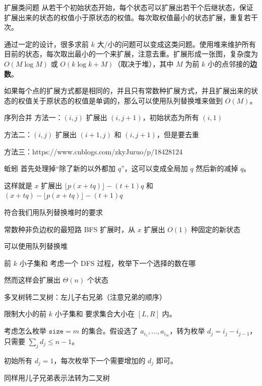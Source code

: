 \documentclass[11pt,aspectratio=169]{beamer}
\begin{document}
\begin{frame}{扩展类问题}
    从若干个初始状态开始，每个状态可以扩展出若干个后继状态，保证扩展出来的状态的权值小于原状态的权值。每次取权值最小的状态扩展，重复若干次。

    通过一定的设计，很多求前 $k$ 大/小的问题可以变成这类问题。使用堆来维护所有目前的状态，每次取出最小的一个来扩展，注意去重。扩展形成一张图，复杂度为 $O(M\log M)$ 或 $O(k\log k+M)$（取决于堆），其中 $M$ 为前 $k$ 小的点邻接的\textbf{边数}。

    如果每个点的扩展方式都是相同的，并且只有常数种扩展方式，并且扩展出来的状态的权值关于原状态的权值是单调的，那么可以使用队列替换堆来做到 $O(M)$。
\end{frame}
\begin{frame}{序列合并}
    方法一：$(i,j)$ 扩展出 $(i,j+1)$，初始状态为所有 $(i,1)$

    方法二：$(i,j)$ 扩展出 $(i+1,j)$ 和 $(i,j+1)$，但是要去重

    方法三：https://www.cnblogs.com/zkyJuruo/p/18428124
\end{frame}
\begin{frame}{蚯蚓}
    首先处理掉“除了新的以外都加 $q$”，这可以变成全局加 $q$ 然后新的减掉 $q$。

    这样就是 $x$ 扩展出 $\lfloor p(x+tq)\rfloor-(t+1)q$ 和 $(x+tq)-\lfloor p(x+tq)\rfloor-(t+1)q$

    符合我们用队列替换堆时的要求
\end{frame}
\begin{frame}{常数种非负边权的最短路}
    BFS 扩展时，从 $x$ 扩展出 $O(1)$ 种固定的新状态

    可以使用队列替换堆
\end{frame}
\begin{frame}{前 $k$ 小子集和}
    考虑一个 DFS 过程，枚举下一个选择的数在哪

    然而这样会扩展出 $\Theta(n)$ 个状态

    多叉树转二叉树：左儿子右兄弟（注意兄弟的顺序）
\end{frame}
\begin{frame}{限制大小的前 $k$ 小子集和}
    要求集合大小在 $[L,R]$ 内。

    考虑怎么枚举 $\mathtt{size}=m$ 的集合。假设选了 $a_{i_1},\ldots,a_{i_m}$，转为枚举 $d_j=i_j-i_{j-1}$，只需要 $\sum_j d_j\le n-1$。
    
    初始所有 $d_j=1$，每次枚举下一个需要增加的 $d_j$ 即可。

    同样用儿子兄弟表示法转为二叉树
\end{frame}
\end{document}
